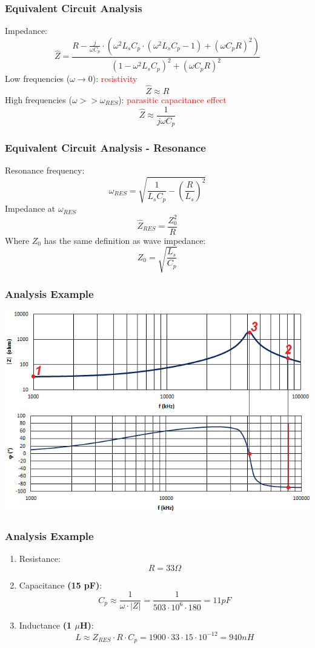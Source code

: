 \documentclass{beamer}
\begin{document}
	\begin{frame}
    \frametitle{Equivalent Circuit Analysis}
		Impedance: 
		$$\hat{Z}= \frac{R - \frac{j}{\omega C_p}\cdot\left(\omega^2 L_sC_p\cdot\left(\omega^2 L_sC_p - 1\right)+\left(\omega C_pR\right)^2\right)}{\left(1-\omega^2 L_sC_p\right)^2+\left(\omega C_pR\right)^2}$$
		Low frequencies ($\omega \rightarrow 0$): \textcolor{red}{resistivity}
		$$\hat{Z}\approx R$$
		High frequencies ($\omega >> \omega_{RES}$): \textcolor{red}{parasitic capacitance effect}
		$$\hat{Z}\approx \frac{1}{j\omega C_p}$$
	\end{frame}
	\begin{frame}
    \frametitle{Equivalent Circuit Analysis - Resonance}
		Resonance frequency:
		$$\omega_{RES}= \sqrt{\frac{1}{L_sC_p} - \left(\frac{R}{L_s}\right)^2}$$
		Impedance at $\omega_{RES}$
		$$\hat{Z}_{RES}=\frac{Z_0^2}{R}$$
		Where $Z_0$ has the same definition as wave impedance:
		$$Z_0 = \sqrt{\frac{L_s}{C_p}}$$
	\end{frame}
	\begin{frame}
    \frametitle{Analysis Example}
		
		\begin{center}
			\includegraphics[scale=0.6]{obr06_prikladR.png}
		\end{center}
	\end{frame}
	\begin{frame}
    \frametitle{Analysis Example}
		
		\begin{enumerate}
		\setcounter{enumi}{0}
			\item Resistance: $$R= 33\Omega$$
			\item Capacitance \textbf{(15 pF)}: $$C_p\approx \frac{1}{\omega \cdot \left|Z\right|}= \frac{1}{503\cdot 10^6\cdot180}= 11pF$$
			\item Inductance \textbf{(1 $\mu$H)}: $$L\approx Z_{RES}\cdot R \cdot C_p = 1900\cdot 33\cdot 15\cdot 10^{-12}= 940 nH$$
		\end{enumerate}
	\end{frame}
\end{document}
